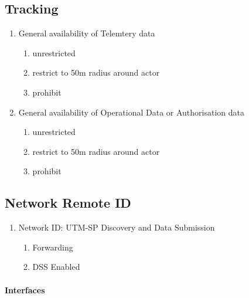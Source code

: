 \documentclass{ua_wgs_questionnaire}
\begin{document}
\begin{Form}[action={http://localhost:8000}, encoding=html, method=post]
\section{Tracking}

\begin{enumerate}

\item General availability of Telemtery data
	\begin{enumerate}
	\item unrestricted
	\item restrict to 50m radius around actor
	\item prohibit
	\end{enumerate}
\item General availability of Operational Data or Authorisation
data
	\begin{enumerate}
	\item unrestricted
	\item restrict to 50m radius around actor
	\item prohibit
	\end{enumerate}
\end{enumerate}

\subsection{Network Remote ID}

\begin{enumerate}
\item Network ID: UTM-SP Discovery and Data Submission
	\begin{enumerate}
		\item Forwarding
		\item DSS Enabled
	\end{enumerate}
\end{enumerate}

\paragraph{Interfaces}


\end{Form}
\end{document}
